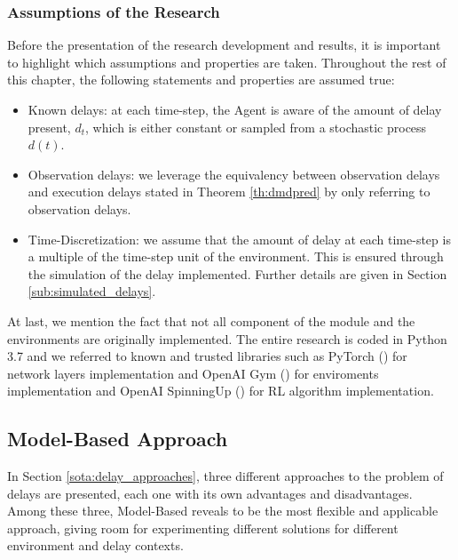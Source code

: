         \subsubsection{Assumptions of the Research}
            Before the presentation of the research development and results, it is important to highlight which assumptions and properties are taken. Throughout the rest of this chapter, the following statements and properties are assumed true:
            \begin{itemize}
                \setlength\itemsep{0.05em}
                \item Known delays: at each time-step, the Agent is aware of the amount of delay present, $d_t$, which is either constant or sampled from a stochastic process $d(t)$.
                \item Observation delays: we leverage the equivalency between observation delays and execution delays stated in Theorem \ref{th:dmdpred} by only referring to observation delays.
                \item Time-Discretization: we assume that the amount of delay at each time-step is a multiple of the time-step unit of the environment. This is ensured through the simulation of the delay implemented. Further details are given in Section \ref{sub:simulated_delays}.
            \end{itemize}
            At last, we mention the fact that not all component of the module and the environments are originally implemented. The entire research is coded in Python 3.7 and we referred to known and trusted libraries such as PyTorch () for network layers implementation and OpenAI Gym () for enviroments implementation and OpenAI SpinningUp () for RL algorithm implementation.
            
        \subsection{Model-Based Approach}
            In Section \ref{sota:delay_approaches}, three different approaches to the problem of delays are presented, each one with its own advantages and disadvantages. Among these three, Model-Based reveals to be the most flexible and applicable approach, giving room for experimenting different solutions for different environment and delay contexts.
